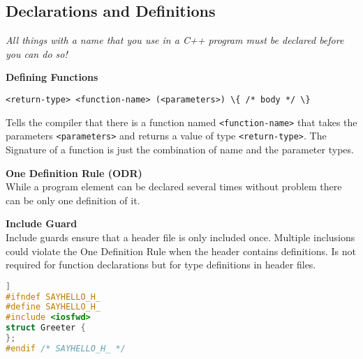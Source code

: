 \subsection{Declarations and Definitions}
\textit{All things with a name that you use in a C++ program must be declared before you can do so!}

\textbf{Defining Functions}
\begin{center}
	\lstinline|<return-type> <function-name> (<parameters>) \{ /* body */ \}|
\end{center}
 Tells the compiler that there is a function named \lstinline|<function-name>| that takes the parameters \lstinline|<parameters>| and returns a value of type \lstinline|<return-type>|. The Signature of a function is just the combination of name and the parameter types. 
 
\textbf{One Definition Rule (ODR)}\\ 
 While a program element can be declared several times without problem there can be only one definition of it.
 
\textbf{Include Guard}\\
Include guards ensure that a header file is only included once. Multiple inclusions could violate the One Definition Rule when the header contains definitions. Is not required for function declarations but for type definitions in header files.
\begin{lstlisting}[language=C++]]
#ifndef SAYHELLO_H_
#define SAYHELLO_H_
#include <iosfwd>
struct Greeter {
};
#endif /* SAYHELLO_H_ */ 
\end{lstlisting}